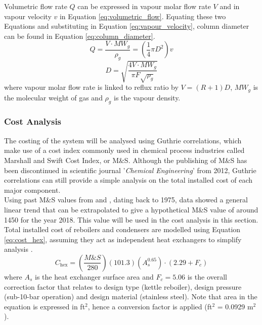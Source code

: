 		\noindent Volumetric flow rate $Q$ can be expressed in vapour molar flow rate $V$ and in vapour velocity $v$ in Equation \ref{eq:volumetric_flow}. Equating these two Equations and substituting in Equation \ref{eq:vapour_velocity}, column diameter can be found in Equation \ref{eq:column_diameter}.
		\begin{equation}
		    Q = \frac{V \cdot MW_g}{\rho_g} = \left(\frac{1}{4}\pi D^2\right)v
		    \label{eq:volumetric_flow}
		\end{equation}
		\begin{equation}
		    D = \sqrt{\frac{4V\cdot MW_g}{\pi F \sqrt{\rho_g}}}
		    \label{eq:column_diameter}
		\end{equation}
		where vapour molar flow rate is linked to reflux ratio by $V = (R+1)D$, $MW_g$ is the molecular weight of gas and $\rho_g$ is the vapour density.
	\subsubsection{Cost Analysis} \label{sec:cost_analysis} \noindent
	The costing of the system will be analysed using Guthrie correlations, which make use of a cost index commonly used in chemical process industries called Marshall and Swift Cost Index, or M\&S. Although the publishing of M\&S has been discontinued in scientific journal '\emph{Chemical Engineering}' from 2012, Guthrie correlations can still provide a simple analysis on the total installed cost of each major component. \\
	Using past M\&S values from \cite{peters1991} and \cite{marshall_swift}, dating back to 1975, data showed a general linear trend that can be extrapolated to give a hypothetical M\&S value of around 1450 for the year 2018. This value will be used in the cost analysis in this section. \\
	
    \noindent Total installed cost of reboilers and condensers are modelled using Equation \ref{eq:cost_hex}, assuming they act as independent heat exchangers to simplify analysis \citep{douglas1988}.
    \begin{equation}
	    C_{\text{hex}} = \left(\frac{M\&S}{280}\right)\left(101.3\right)\left(A_s^{0.65}\right)\cdot (2.29 + F_c)
	    \label{eq:cost_hex}
	\end{equation}
	where $A_s$ is the heat exchanger surface area and $F_c = 5.06$ is the overall correction factor that relates to design type (kettle reboiler), design pressure (sub-10-bar operation) and design material (stainless steel). Note that area in the equation is expressed in ft$^2$, hence a conversion factor is applied (ft$^2$ = 0.0929 m$^2$). \\
	
